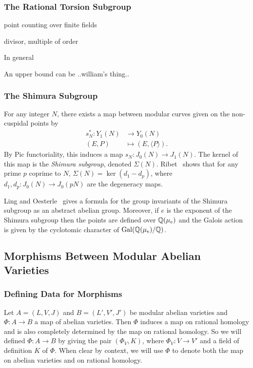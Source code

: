 \documentclass{article}
\begin{document}
\subsubsection{The Rational Torsion Subgroup}

point counting over finite fields

divisor, multiple of order


In general 

An upper bound can be
..william's thing..

\subsubsection{The Shimura Subgroup}

For any integer $N$, there exists a map between modular curves given
on the non-cuspidal points by
\begin{align*}
    s_N ^*: Y_1(N) & \to Y_0(N) \\
    (E, P)      & \mapsto (E, \langle P \rangle).
\end{align*}
By Pic functoriality, this induces a map $s_N: J_0(N)\to J_1(N)$. The kernel of
this map is the \emph{Shimura subgroup}, denoted $\Sigma(N)$.
Ribet~\cite[Theorem 4.3]{ribet:congrel} shows that for any prime $p$ coprime to
$N$, $\Sigma(N)=\ker(d_1 - d_p)$, where $d_1,d_p :J_0(N)\to J_0(pN)$ are the
degeneracy maps. 

Ling and Oesterle~\cite[Theorem 1,2]{MR1141458} gives a formula for the group
invariants of the Shimura subgroup as an abstract abelian group. Moreover, if
$e$ is the exponent of the Shimura subgroup then the points are defined over
$\mathbb{Q}(\mu_e)$ and the Galois action is given by the cyclotomic character of
$\operatorname{Gal}(\mathbb{Q}(\mu_e)/\mathbb{Q})$.

\subsection{Morphisms Between Modular Abelian Varieties}



\subsubsection{Defining Data for Morphisms}

Let $A=(L, V, J)$ and $B=(L', V', J')$ be modular abelian varieties and
$\Phi:A\to B$ a map of abelian varieties. Then $\Phi$ induces a map on rational
homology and is also completely determined by the map on rational homology.
So we will defined $\Phi:A\to B$ by giving the pair $(\Phi_V, K)$, where
$\Phi_V:V\to V'$ and a field of definition $K$ of $\Phi$. When clear by
context, we will use $\Phi$ to denote both the map on abelian varieties and on
rational homology.
\end{document}
